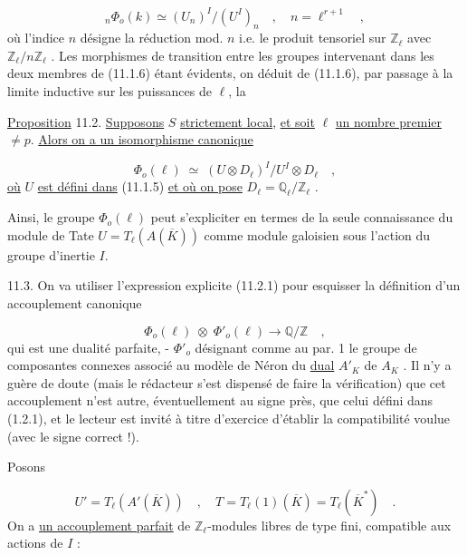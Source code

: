 \begin{equation}\tag{11.1.6}
{}_{n}\Phi_{o}(k) \simeq (U_{n})^{I}/(U^{I})_{n} \quad , \quad n = \ell^{r+1} \quad ,
\end{equation}
où l'indice $n$ désigne la réduction mod. $n$ i.e. le produit tensoriel sur $\mathbb{Z}_{\ell}$ avec $\mathbb{Z}_{\ell}/n\mathbb{Z}_{\ell}$ . Les morphismes de transition entre les groupes intervenant dans les deux membres de (11.1.6) étant évidents, on déduit de (11.1.6), par passage à la limite inductive sur les puissances de $\ell$, la



\underline{Proposition} 11.2. \underline{Supposons} $S$ \underline{strictement local}, \underline{et soit} $\ell$ \underline{un nombre premier} $\neq p$. \underline{Alors on a un isomorphisme canonique}

\begin{equation}\tag{11.2.1}
\Phi_o(\ell) \;\simeq\; (U\otimes D_\ell)^I/U^I\otimes D_\ell \quad ,
\end{equation}
\underline{où} $U$ \underline{est défini dans} (11.1.5) \underline{et où on pose} $D_\ell = \mathbb{Q}_\ell/\mathbb{Z}_\ell$ .

Ainsi, le groupe $\Phi_o(\ell)$ peut s'expliciter en termes de la seule connaissance du module de Tate $U = T_\ell(A(\overline{K}))$ comme module galoisien sous l'action du groupe d'inertie $I$.

11.3. On va utiliser l'expression explicite (11.2.1) pour esquisser la définition d'un accouplement canonique

\begin{equation}\tag{11.3.1}
\Phi_o(\ell) \;\otimes\; \Phi'_o(\ell) \longrightarrow \mathbb{Q}/\mathbb{Z} \quad ,
\end{equation}
qui est une dualité parfaite, - $\Phi'_o$ désignant comme au par. 1 le groupe de composantes connexes associé au modèle de Néron du \underline{dual} $A'_K$ de $A_K$ . Il n'y a guère de doute (mais le rédacteur s'est dispensé de faire la vérification) que cet accouplement n'est autre, éventuellement au signe près, que celui défini dans (1.2.1), et le lecteur est invité à titre d'exercice d'établir la compatibilité voulue (avec le signe correct !).

Posons

\begin{equation*}
U' = T_\ell(A'(\overline{K})) \quad , \quad T = T_\ell(1)(\overline{K}) = T_\ell(\overline{K}^*) \quad .
\end{equation*}
On a \underline{un accouplement parfait} de $\mathbb{Z}_\ell$-modules libres de type fini, compatible aux actions de $I$ :

